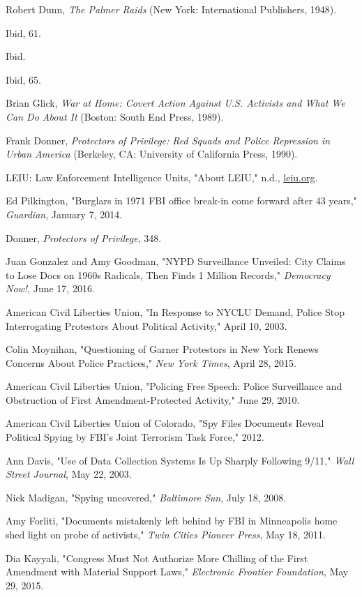 \documentclass[fontset=fandol, a4paper, 12pt, openright]{ctexbook}
\begin{document}
\begin{enumerate}[label={[\arabic*]}]
    \item Robert Dunn, \textit{The Palmer Raids} (New York: International Publishers, 1948).
    \item Ibid, 61.
    \item Ibid.
    \item Ibid, 65.
    \item Brian Glick, \textit{War at Home: Covert Action Against U.S. Activists and What We Can Do About It} (Boston: South End Press, 1989).
    \item Frank Donner, \textit{Protectors of Privilege: Red Squads and Police Repression in Urban America} (Berkeley, CA: University of California Press, 1990).
    \item LEIU: Law Enforcement Intelligence Units, "About LEIU," n.d., \url{leiu.org}.
    \item Ed Pilkington, "Burglars in 1971 FBI office break-in come forward after 43 years," \textit{Guardian}, January 7, 2014.
    \item Donner, \textit{Protectors of Privilege}, 348.
    \item Juan Gonzalez and Amy Goodman, "NYPD Surveillance Unveiled: City Claims to Lose Docs on 1960s Radicals, Then Finds 1 Million Records," \textit{Democracy Now!}, June 17, 2016.
    \item American Civil Liberties Union, "In Response to NYCLU Demand, Police Stop Interrogating Protestors About Political Activity," April 10, 2003.
    \item Colin Moynihan, "Questioning of Garner Protestors in New York Renews Concerns About Police Practices," \textit{New York Times}, April 28, 2015.
    \item American Civil Liberties Union, "Policing Free Speech: Police Surveillance and Obstruction of First Amendment-Protected Activity," June 29, 2010.
    \item American Civil Liberties Union of Colorado, "Spy Files Documents Reveal Political Spying by FBI's Joint Terrorism Task Force," 2012.
    \item Ann Davis, "Use of Data Collection Systems Is Up Sharply Following 9/11," \textit{Wall Street Journal}, May 22, 2003.
    \item Nick Madigan, "Spying uncovered," \textit{Baltimore Sun}, July 18, 2008.
    \item Amy Forliti, "Documents mistakenly left behind by FBI in Minneapolis home shed light on probe of activists," \textit{Twin Cities Pioneer Press}, May 18, 2011.
    \item Dia Kayyali, "Congress Must Not Authorize More Chilling of the First Amendment with Material Support Laws," \textit{Electronic Frontier Foundation}, May 29, 2015.

\end{enumerate}
\end{document}
